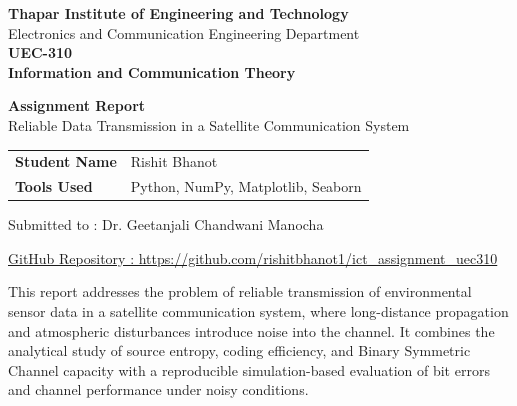 \documentclass[12pt,a4paper]{article}
\begin{document}
\begin{titlepage}
\thispagestyle{empty}
\centering
\vspace*{1.3cm}
{\large \textbf{Thapar Institute of Engineering and Technology}}\\[0.25cm]
{\normalsize Electronics and Communication Engineering Department}\\[1.4cm]

{\Huge \bfseries UEC-310}\\[0.2cm]
{\LARGE \bfseries Information and Communication Theory}\\[1.2cm]

\begin{tcolorbox}[enhanced,boxrule=0pt,colback=softblue,width=0.88\textwidth,arc=3mm]
\centering
{\Large \bfseries Assignment Report}\\[0.25cm]
Reliable Data Transmission in a Satellite Communication System
\end{tcolorbox}

\vspace{1.6cm}
\renewcommand{\arraystretch}{1.35}
\begin{tabular}{>{\bfseries}p{4.2cm}p{6.8cm}}
Student Name & Rishit Bhanot \\
Tools Used & Python, NumPy, Matplotlib, Seaborn \\
\end{tabular}
\vspace{1.6cm}

\begin{tcolorbox}[enhanced,boxrule=0pt,colback=softblue,width=0.88\textwidth,arc=3mm]
\centering
Submitted to : Dr. Geetanjali Chandwani Manocha
\end{tcolorbox}
\vspace{1.6cm}

\begin{tcolorbox}[enhanced,boxrule=0pt,colback=softyellow,width=0.88\textwidth,arc=3mm]
\centering
\href{https://github.com/rishitbhanot1/ict_assignment_uec310}{GitHub Repository : https://github.com/rishitbhanot1/ict\_assignment\_uec310}
\end{tcolorbox}

\vfill
\begin{tcolorbox}[enhanced,boxrule=0pt,colback=softgray,width=0.9\textwidth,arc=2mm]
\small
This report addresses the problem of reliable transmission of environmental sensor data in a satellite communication system, where long-distance propagation and atmospheric disturbances introduce noise into the channel. It combines the analytical study of source entropy, coding efficiency, and Binary Symmetric Channel capacity with a reproducible simulation-based evaluation of bit errors and channel performance under noisy conditions.
\end{tcolorbox}

\vfill
\end{titlepage}
\end{document}
